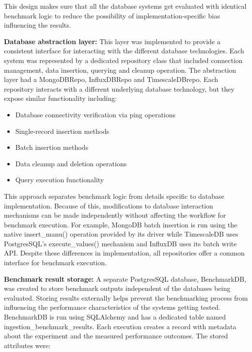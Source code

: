 This design makes sure that all the database systems get evaluated with identical benchmark logic to reduce the possibility of implementation-specific bias influencing the results. 

\textbf{Database abstraction layer:}
This layer was implemented to provide a consistent interface for interacting with the different database technologies. Each system was represented by a dedicated repository class that included connection management, data insertion, querying and cleanup operation. The abstraction layer had a MongoDBRepo, InfluxDBRepo and TimescaleDBrepo. Each repository interacts with a different underlying database technology, but they expose similar functionality including:
\begin{itemize}
    \item Database connectivity verification via ping operations
    \item Single-record insertion methods
    \item Batch insertion methods
    \item Data cleanup and deletion operations
    \item Query execution functionality
\end{itemize}

This approach separates benchmark logic from details specific to database implementation. Because of this, modifications to database interaction mechanisms can be made independently without affecting the workflow for benchmark execution. For example, MongoDB batch insertion is run using the native insert\_manu() operation provided by its driver while TimescaleDB uses PostgresSQL’s execute\_values() mechanism and InfluxDB uses its batch write API. Despite these differences in implementation, all repositories offer a common interface for benchmark execution. 


\textbf{Benchmark result storage:}
A separate PostgresSQL database, BenchmarkDB, was created to store benchmark outputs independent of the databases being evaluated. Storing results externally helps prevent the benchmarking process from influencing the performance characteristics of the systems getting tested. BenchmarkDB is run using SQLAlchemy and has a dedicated table named ingestion\_benchmark\_results. Each execution creates a record with metadata about the experiment and the measured performance outcomes. The stored attributes were:

